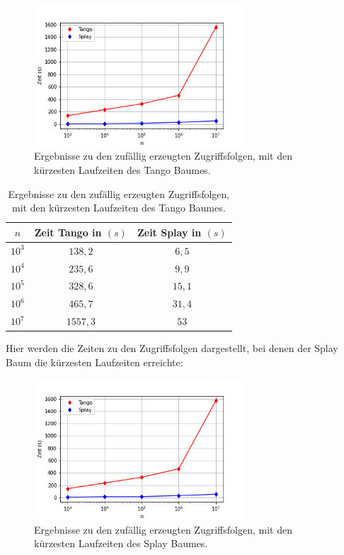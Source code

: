 \documentclass[a4paper,12pt]{article}
\begin{document}
\begin{figure}[H]
	\centering
	\includegraphics[width=0.7\textwidth]{Medien/laufzeittest/diagramm/randomaccess1}
	\caption{Ergebnisse zu den zufällig erzeugten Zugriffsfolgen, mit den kürzesten Laufzeiten des Tango Baumes.}
 	
\end{figure}
\begin{table}[H]
	\begin{center}
		\begin{tabular}[c]{|c|c|c|}
			\hline
			$n$ & Zeit Tango in $\left(s\right)$ &Zeit Splay in $\left(s\right)$ \\
			\hline
			$10^3$ & $138,2$ &$6,5$ \\
			\hline
			$10^4$  & $235,6$ &$9,9$  \\
			\hline
			$10^5$  & $328,6$ &$15,1$  \\
			\hline
			$10^6$  & $465,7$ &$31,4$  \\
			\hline
			$10^7$  & $1557,3$ &$53$  \\
			\hline
		\end{tabular}
		\caption{Ergebnisse zu den zufällig erzeugten Zugriffsfolgen, mit den kürzesten Laufzeiten des Tango Baumes.} 
	\end{center}
\end{table}
\noindent	Hier werden die Zeiten zu den Zugriffsfolgen dargestellt, bei denen der Splay Baum die kürzesten  Laufzeiten erreichte:
\begin{figure}[H]
	\centering
	\includegraphics[width=0.7\textwidth]{Medien/laufzeittest/diagramm/randomaccess2}
	\caption{Ergebnisse zu den zufällig erzeugten Zugriffsfolgen, mit den kürzesten Laufzeiten des Splay Baumes.}
	
\end{figure}
\end{document}

